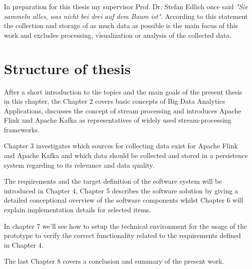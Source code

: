 In preparation for this thesis my supervisor Prof. Dr. Stefan Edlich once said \textit{"Sie sammeln
alles, was nicht bei drei auf dem Baum ist"}. According to this statement the collection and
storage of as much data as possible is the main focus of this work and excludes processing,
visualization or analysis of the collected data.

\section{Structure of thesis}

After a short introduction to the topics and the main goals of the present thesis in this
chapter, the Chapter 2 covers basic concepts of Big Data Analytics Applications, discusses
the concept of stream processing and introduces Apache Flink and Apache Kafka as
representatives of widely used stream-processing frameworks.

Chapter 3 investigates which sources for collecting data exist for Apache Flink and Apache
Kafka and which data should be collected and stored in a persistence system regarding
to its relevance and data quality.

The requirements and the target definition of the software system will be introduced in
Chapter 4, Chapter 5 describes the software solution by giving a detailed conceptional
overview of the software components whilst Chapter 6 will explain implementation details
for selected items.

In chapter 7 we'll see how to setup the technical environment for the usage of the prototype
to verify the correct functionality related to the requirements defined in Chapter 4.

The last Chapter 8 covers a conclusion and summary of the present work.